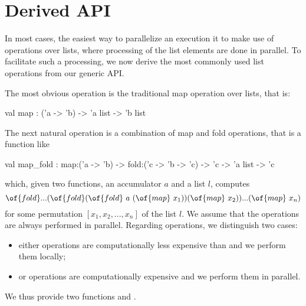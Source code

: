 \documentclass[a4paper,12pt]{article}
\newcommand{\Ocaml}{OCaml}
\begin{document}
\begin{comment}
When master and worker programs are compiled with different
versions of the \Ocaml\ compiler, our library still provides
a monomorphic API over strings. As a consequence, we need to convert
integers to and from strings in both master and worker.
The modified worker program is as follows:
\begin{ocaml}
  open Mono
  let worker i = ...
  let worker_string i = string_of_int (worker (int_of_string i))
  let () = Worker.compute worker_string ()
\end{ocaml}
The master program is modified in a similar way.
We simply replace \of{Poly} with \of{Mono} and encode/decode integers
as strings, as follows:
\begin{ocaml}
  let tasks = 
    let l = ref [] in 
    for i = 0 to n do l := (string_of_int i, ()) :: !l done; 
    !l
  let master (i,()) fi = s := !s + int_of_string fi; []
\end{ocaml}
\end{comment}

\section{Derived API}\label{sec:derived}

In most cases, the easiest way to parallelize an execution it to make
use of operations over lists, where processing of the
list elements are done in parallel. 
To facilitate such a processing,
we now derive the most commonly used list operations from our generic
API.

The most obvious operation is the traditional map operation over
lists, that is:
\begin{ocaml}
  val map : ('a -> 'b) -> 'a list -> 'b list
\end{ocaml}
The next natural operation is a combination of map and fold
operations, that is a function like
\begin{ocaml}
 val map_fold : map:('a -> 'b) -> fold:('c -> 'b -> 'c) -> 'c -> 'a list -> 'c
\end{ocaml}
which, given two functions, an accumulator $a$ and a list $l$, computes
\begin{equation}\label{eq:map-fold}
  \of{fold} ... (\of{fold} (\of{fold} ~ a ~ (\of{map} ~ x_1)) (\of{map} ~ x_2))
  ... (\of{map} ~ x_n)
\end{equation}
for some permutation $[x_1,x_2,...,x_n]$ of the list $l$.
We assume that the  operations are always performed in parallel.
Regarding  operations, we distinguish two cases:
\begin{itemize}
\item either  operations are computationally less expensive
  than  and we perform them locally;
\item or  operations are computationally expensive and we
  perform them in parallel.
\end{itemize}
We thus provide two functions  and .
\end{document}
